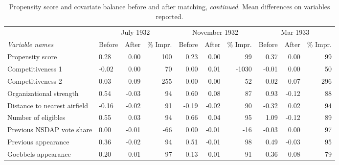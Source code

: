 \begin{table}[t!]
\centering
\caption{Propensity score and covariate balance before and after matching, \textit{continued}. Mean differences on variables reported.\label{tab:balance2}} 
\begingroup\scriptsize
\begin{tabular}{llrrrrrrrr}
  \toprule
   & \multicolumn{3}{c}{July 1932} &  \multicolumn{3}{c}{November 1932} & \multicolumn{3}{c}{Mar 1933}\\\cmidrule(r){2-4} \cmidrule(r){5-7} \cmidrule(r){8-10}\textit{Variable names} & Before & After & \% Impr. & Before & After & \% Impr. & Before & After & \% Impr.\\ \midrule
Propensity score & 0.28 & 0.00 & 100 & 0.23 & 0.00 & 99 & 0.37 & 0.00 & 99 \\ 
  Competitiveness 1 & -0.02 & 0.00 & 70 & 0.00 & 0.01 & -1030 & -0.01 & 0.00 & 50 \\ 
  Competitiveness 2 & 0.03 & -0.09 & -255 & 0.00 & 0.00 & 52 & 0.02 & -0.07 & -296 \\ 
  Organizational strength & 0.54 & -0.03 & 94 & 0.60 & 0.08 & 87 & 0.93 & -0.12 & 88 \\ 
  Distance to nearest airfield & -0.16 & -0.02 & 91 & -0.19 & -0.02 & 90 & -0.32 & 0.02 & 94 \\ 
  Number of eligibles & 0.55 & 0.03 & 94 & 0.66 & 0.04 & 95 & 1.09 & -0.12 & 89 \\ 
  Previous NSDAP vote share & 0.00 & -0.01 & -66 & 0.00 & -0.01 & -16 & -0.03 & 0.00 & 97 \\ 
  Previous appearance & 0.36 & -0.02 & 94 & 0.51 & -0.01 & 98 & 0.49 & -0.03 & 95 \\ 
  Goebbels appearance & 0.20 & 0.01 & 97 & 0.13 & 0.01 & 91 & 0.36 & 0.08 & 79 \\ 
   \bottomrule
\end{tabular}
\endgroup
\end{table}
